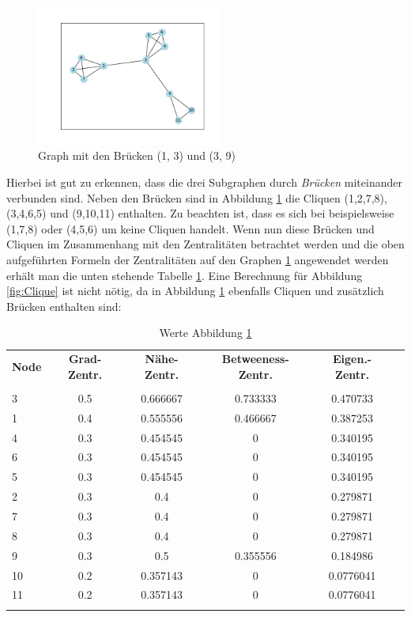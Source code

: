 \FloatBarrier
\begin{figure}[htb!]
    \centering
    \includegraphics[width=0.55\textwidth]{Graphics/Bridge.png}
    \caption{Graph mit den Brücken (1, 3) und (3, 9)}
    \label{fig:Bridge}
\end{figure}
Hierbei ist gut zu erkennen, dass die drei Subgraphen durch \textit{Brücken} miteinander verbunden sind. Neben den Brücken sind in Abbildung \ref{fig:Bridge} die Cliquen (1,2,7,8), (3,4,6,5) und (9,10,11) enthalten. Zu beachten ist, dass es sich bei beispielsweise (1,7,8) oder (4,5,6) um keine Cliquen handelt. Wenn nun diese Brücken und Cliquen im Zusammenhang mit den Zentralitäten  betrachtet werden und die oben aufgeführten Formeln der Zentralitäten auf den Graphen \ref{fig:Bridge} angewendet werden erhält man die unten stehende Tabelle \ref{table:TableCliqueBridg}. Eine Berechnung für Abbildung \ref{fig:Clique} ist nicht nötig, da in Abbildung \ref{fig:Bridge} ebenfalls Cliquen und zusätzlich Brücken enthalten sind:
\begin{table}[h!]
\centering
\footnotesize
\caption{Werte Abbildung \ref{fig:Bridge}}
\label{table:TableCliqueBridg}
\begin{tabular}{lccccc}\toprule
\textbf{Node} & \textbf{Grad-Zentr.} &\textbf{Nähe-Zentr.} &\textbf{Betweeness-Zentr.} & \textbf{Eigen.-Zentr.} \\
 &\\\midrule
  3 & 0.5 & 0.666667 & 0.733333 & 0.470733  \\
  1 & 0.4 & 0.555556 & 0.466667 & 0.387253  \\
  4 & 0.3 & 0.454545 & 0        & 0.340195  \\
  6 & 0.3 & 0.454545 & 0        & 0.340195  \\
  5 & 0.3 & 0.454545 & 0        & 0.340195  \\
  2 & 0.3 & 0.4      & 0        & 0.279871  \\
  7 & 0.3 & 0.4      & 0        & 0.279871  \\
  8 & 0.3 & 0.4      & 0        & 0.279871  \\
  9 & 0.3 & 0.5      & 0.355556 & 0.184986  \\
 10 & 0.2 & 0.357143 & 0        & 0.0776041 \\
 11 & 0.2 & 0.357143 & 0        & 0.0776041 \\
       
  \\\bottomrule
 \end{tabular}
 \end{table}

